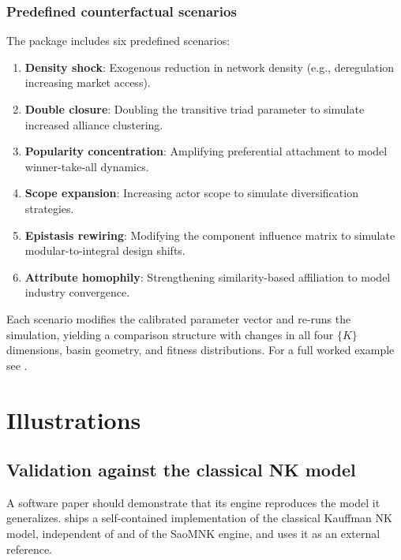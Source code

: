 \documentclass[
  article]{jss}
\begin{document}
\subsubsection{Predefined counterfactual
scenarios}\label{predefined-counterfactual-scenarios}

The package includes six predefined scenarios:

\begin{enumerate}
\item \textbf{Density shock}: Exogenous reduction in network density
  (e.g., deregulation increasing market access).
\item \textbf{Double closure}: Doubling the transitive triad parameter to
  simulate increased alliance clustering.
\item \textbf{Popularity concentration}: Amplifying preferential attachment
  to model winner-take-all dynamics.
\item \textbf{Scope expansion}: Increasing actor scope to simulate
  diversification strategies.
\item \textbf{Epistasis rewiring}: Modifying the component influence
  matrix to simulate modular-to-integral design shifts.
\item \textbf{Attribute homophily}: Strengthening similarity-based
  affiliation to model industry convergence.
\end{enumerate}

\noindent Each scenario modifies the calibrated parameter vector and
re-runs the simulation, yielding a comparison structure with changes in
all four \(\{K\}\) dimensions, basin geometry, and fitness
distributions. For a full worked example see
.

\section{Illustrations}\label{sec:illustrations}

\subsection{Validation against the classical NK
model}\label{sec:validation}

A software paper should demonstrate that its engine reproduces the model
it generalizes.  ships a self-contained implementation of
the classical Kauffman NK model, independent of  and of the
SaoMNK engine, and uses it as an external reference.
\end{document}

